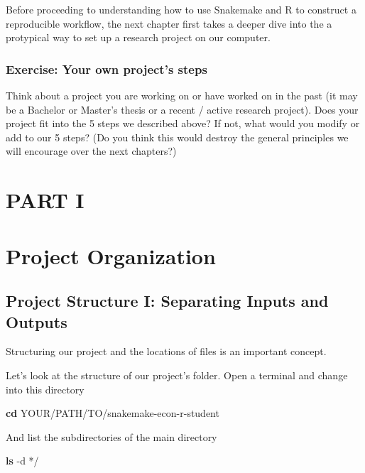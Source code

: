 \documentclass[]{book}
\newenvironment{Shaded}{\begin{snugshade}}{\end{snugshade}}
\newcommand{\KeywordTok}[1]{\textcolor[rgb]{0.13,0.29,0.53}{\textbf{{#1}}}}
\newcommand{\NormalTok}[1]{{#1}}
\theoremstyle{definition}
\theoremstyle{definition}
\theoremstyle{definition}
\theoremstyle{remark}
\begin{document}
Before proceeding to understanding how to use Snakemake and R to
construct a reproducible workflow, the next chapter first takes a deeper
dive into the a protypical way to set up a research project on our
computer.

\subsection*{Exercise: Your own project's
steps}\label{exercise-your-own-projects-steps}

Think about a project you are working on or have worked on in the past
(it may be a Bachelor or Master's thesis or a recent / active research
project). Does your project fit into the 5 steps we described above? If
not, what would you modify or add to our 5 steps? (Do you think this
would destroy the general principles we will encourage over the next
chapters?)

\chapter*{PART I}\label{part-i}

\chapter{Project Organization}\label{project-organization}

\section{Project Structure I: Separating Inputs and
Outputs}\label{project-structure-i-separating-inputs-and-outputs}

Structuring our project and the locations of files is an important
concept.

Let's look at the structure of our project's folder. Open a terminal and
change into this directory

\begin{Shaded}
\begin{Highlighting}[]
\KeywordTok{cd} \NormalTok{YOUR/PATH/TO/snakemake-econ-r-student}
\end{Highlighting}
\end{Shaded}

And list the subdirectories of the main directory

\begin{Shaded}
\begin{Highlighting}[]
\KeywordTok{ls} \NormalTok{-d */}
\end{Highlighting}
\end{Shaded}
\end{document}
